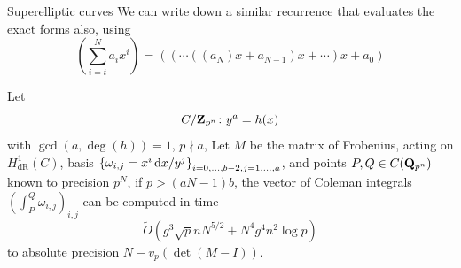 \begin{frame}{Superelliptic curves}
    We can write down a similar recurrence that evaluates the exact forms also, using 
    \[\left(\sum_{i = t}^N a_i x^i\right)= ((\cdots ((a_N)x + a_{N-1})x  + \cdots)x + a_0)\]
    \begin{theorem}[B.]
        Let \vspace{-13pt} $$ C/\mathbf{Z}_{p^n}\colon y^a = h(x)$$
        with $ \gcd(a,\deg(h)) = 1$, $ p\nmid a$, Let $ M$ be the matrix of Frobenius, acting on  $ H^1_\mathrm{dR}(C)$, basis $ {\{\omega_{i,j}= x^i\mathop{}\!\mathrm{d} x /y^j\}}_{i=0,\ldots, b-2,j=1,\ldots,a}$, and points $ P,Q\in C(\mathbf Q_{p^n})$ known to precision $ p^N$, if $ p \gt (aN - 1)b$, the vector of Coleman integrals $\left(\int_P^Q \omega_{i,j}\right)_{i,j}$ can be computed in time \vspace{-13pt}
        $$ \widetilde O\left(g^3 \sqrt{p}n N^{5/2} + N^4 g^4 n^2 \log p \right)$$
        to absolute precision  $ N - v_p(\det(M-I))$.
    \end{theorem}
\end{frame}



